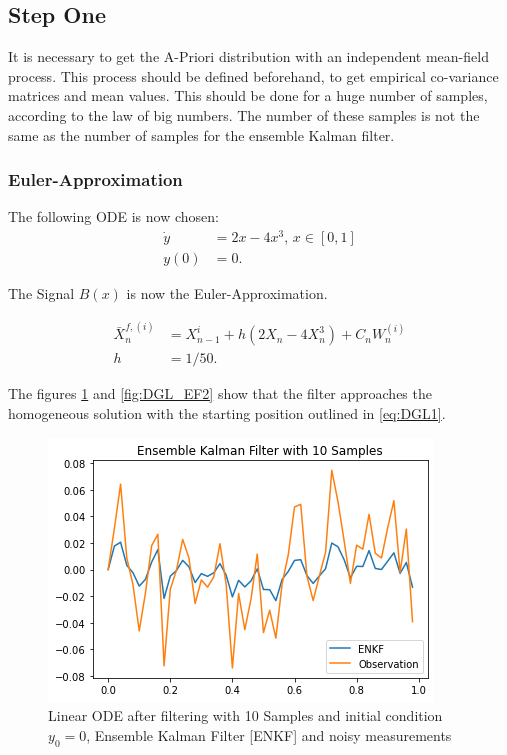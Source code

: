 \documentclass{article}
\begin{document}
\subsection{Step One}
It is necessary to get the A-Priori distribution with an independent mean-field process. This process should be defined beforehand, to get empirical co-variance matrices and mean values. This should be done for a huge number of samples, according to the law of big numbers. The number of these samples is not the same as the number of samples for the ensemble Kalman filter. \\

\subsubsection{Euler-Approximation}

The following ODE is now chosen:
\begin{align}
    \dot{y}&=2x-4x^3, \, x\in[0,1]\\
    y(0) &= 0.
    \label{eq:DGL1}
\end{align}

The Signal $B(x)$ is now the Euler-Approximation.

\begin{align}
     \bar{X}_n^{f,(i)}&= X_{n-1}^{i}+ h\left( 2X_{n}-4X_n^3 \right) + C_n W_n^{(i)}\\
     h &= 1/50.
\end{align}

The figures \ref{fig:DGL_EF} and \ref{fig:DGL_EF2} show that the filter approaches the homogeneous solution with the starting position outlined in \ref{eq:DGL1}.

\begin{figure}[!ht]
\centering
    \includegraphics{M10.png}
    \caption{Linear ODE after filtering with 10 Samples and initial condition $y_0=0$, Ensemble Kalman Filter [ENKF] and noisy measurements}
    \label{fig:DGL_EF}
\end{figure}
\end{document}
